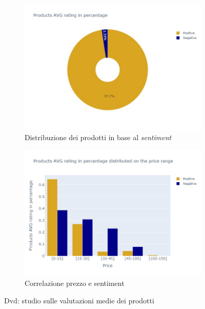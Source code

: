				\begin{figure} [h]
					\centering
					\begin{subfigure}{0.48\textwidth}
						\includegraphics[width=\textwidth]{Figure/pie_dvd}
					\caption{Distribuzione dei prodotti in base al \textit{sentiment}}
					\label{fig:pie_dvd}
				\end{subfigure}
				\begin{subfigure}{0.48\textwidth}
					\includegraphics[width=\textwidth]{Figure/priceVSrating_dvd}
					\caption{Correlazione prezzo e sentiment}
					\label{fig:priceVSrating_dvd}
				\end{subfigure}
				\caption{Dvd: studio sulle valutazioni medie dei prodotti}\label{fig:price_raiting_dvd}
			\end{figure}
		
